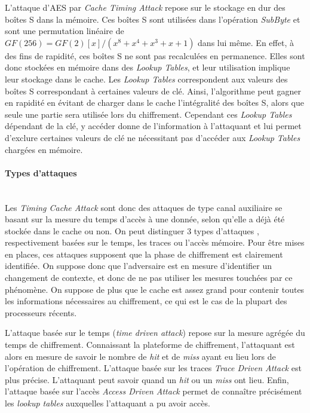 \documentclass[a4paper,11pt]{article}
\begin{document}
L'attaque d'AES par \emph{Cache Timing Attack} repose sur le stockage en dur des boîtes S dans la mémoire. Ces boîtes S sont utilisées dans l'opération \emph{SubByte} et sont une permutation linéaire de $ GF(256) = GF(2)[x]/(x^8+x^4+x^3+x+1) $ dans lui même. En effet, à des fins de rapidité, ces boîtes S ne sont pas recalculées en permanence. Elles sont donc stockées en mémoire dans des \emph{Lookup Tables}, et leur utilisation implique leur stockage dans le cache. Les \emph{Lookup Tables} correspondent aux valeurs des boîtes S correspondant à certaines valeurs de clé. Ainsi, l'algorithme peut gagner en rapidité en évitant de charger dans le cache l'intégralité des boîtes S, alors que seule une partie sera utilisée lors du chiffrement. Cependant ces \emph{Lookup Tables} dépendant de la clé, y accéder donne de l'information à l'attaquant et lui permet d'exclure certaines valeurs de clé ne nécessitant pas d'accéder aux \emph{Lookup Tables} chargées en mémoire.

\paragraph{Types d'attaques}~\\
Les \emph{Timing Cache Attack} sont donc des attaques de type canal auxiliaire se basant sur la mesure du temps d'accès à une donnée, selon qu'elle a déjà été stockée dans le cache ou non. On peut distinguer 3 types d'attaques \cite{aciiccmez2006trace}, respectivement basées sur le temps, les traces ou l'accès mémoire.
Pour être mises en places, ces attaques supposent que la phase de chiffrement est clairement identifiée. On suppose donc que l'adversaire est en mesure d'identifier un changement de contexte, et donc de ne pas utiliser les mesures touchées par ce phénomène. %
On suppose de plus que le cache est assez grand pour contenir toutes les informations nécessaires au chiffrement, ce qui est le cas de la plupart des processeurs récents.

L'attaque basée sur le temps (\emph{time driven attack}) repose sur la mesure agrégée du temps de chiffrement. Connaissant la plateforme de chiffrement, l'attaquant est alors en mesure de savoir le nombre de \emph{hit} et de \emph{miss} ayant eu lieu lors de l'opération de chiffrement.
L'attaque basée sur les traces \emph{Trace Driven Attack} est plus précise. L'attaquant peut savoir quand un \emph{hit} ou un \emph{miss} ont lieu. %
Enfin, l'attaque basée sur l'accès \emph{Access Driven Attack} permet de connaître précisément les \emph{lookup tables} auxquelles l'attaquant a pu avoir accès. %
 
\end{document}
